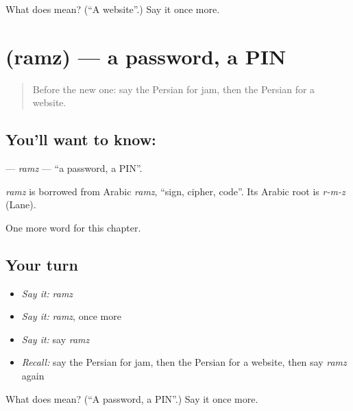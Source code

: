 \begin{tcolorbox}[breakable,colback=teal!4,colframe=teal!35!black,title={Before you move on}]
What does  mean? (\textquotedblleft{}A website\textquotedblright{}.) Say it once more.
\end{tcolorbox}
\section[\texorpdfstring{\fa{رمز} (ramz)}{رمز (ramz)}]{ (ramz) — a password, a PIN}

\label{lesson:FA-C168-ramz}



\begin{quote}
Before the new one: say the Persian for jam, then the Persian for a website.
\end{quote}

\subsection*{You'll want to know: }
\textbf{} — \emph{ramz} — \textquotedblleft{}a password, a PIN\textquotedblright{}.

\begin{cousinweb}
\emph{ramz} is borrowed from Arabic \emph{ramz}, \textquotedblleft{}sign, cipher, code\textquotedblright{}. Its Arabic root is \emph{r-m-z} (Lane).
\end{cousinweb}

\begin{grammarlens}[title={What you've built}]
One more word for this chapter.
\end{grammarlens}

\subsection*{Your turn}
\begin{itemize}
\raggedright
  \item \emph{Say it:} \emph{ramz}
  \item \emph{Say it:} \emph{ramz}, once more
  \item \emph{Say it:} say \emph{ramz}
  \item \emph{Recall:} say the Persian for jam, then the Persian for a website, then say \emph{ramz} again
\end{itemize}

\begin{tcolorbox}[breakable,colback=teal!4,colframe=teal!35!black,title={Before you move on}]
What does  mean? (\textquotedblleft{}A password, a PIN\textquotedblright{}.) Say it once more.
\end{tcolorbox}
